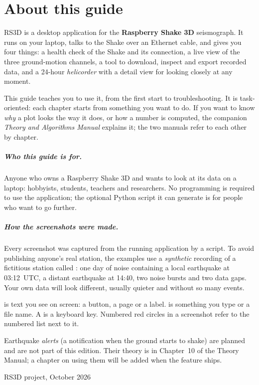 \chapter*{About this guide}

RS3D is a desktop application for the \textbf{Raspberry Shake 3D} seismograph. It runs on your laptop, talks to the Shake over
an Ethernet cable, and gives you four things: a health check of the Shake and its connection, a live view of the three
ground-motion channels, a tool to download, inspect and export recorded data, and a 24-hour \emph{helicorder} with a detail
view for looking closely at any moment.

This guide teaches you to use it, from the first start to troubleshooting. It is task-oriented: each chapter starts from
something you want to do. If you want to know \emph{why} a plot looks the way it does, or how a number is computed, the
companion \emph{Theory and Algorithms Manual} explains it; the two manuals refer to each other by chapter.

\paragraph{Who this guide is for.} Anyone who owns a Raspberry Shake 3D and wants to look at its data on a laptop: hobbyists,
students, teachers and researchers. No programming is required to use the application; the optional Python script it can
generate is for people who want to go further.

\paragraph{How the screenshots were made.} Every screenshot was captured from the running application by a script. To avoid
publishing anyone's real station, the examples use a \emph{synthetic} recording of a fictitious station called
: one day of noise containing a local earthquake at 03:12~UTC, a distant earthquake at 14:40, two noise bursts and two
data gaps. Your own data will look different, usually quieter and without so many events.

\begin{rs3dkey}
 is text you see on screen: a button, a page or a label.  is something you type or a file
name. A  is a keyboard key. Numbered red circles in a screenshot refer to the numbered list next to it.
\end{rs3dkey}

\begin{rs3dnote}
Earthquake \emph{alerts} (a notification when the ground starts to shake) are planned and are not part of this edition.
Their theory is in Chapter~10 of the Theory Manual; a chapter on using them will be added when the feature ships.
\end{rs3dnote}

\bigskip
\begin{center}\small\textsf{\textcolor{rs3dgrey}{RS3D project, October 2026}}\end{center}
